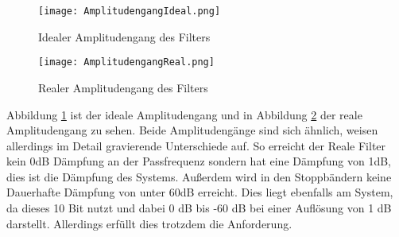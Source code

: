 \begin{figure}[H]
  \centering
    \texttt{[image: AmplitudengangIdeal.png]}
  \caption{Idealer Amplitudengang des Filters}
  \label{fig:AmpBandIdeal}
\end{figure}
\begin{figure}[H]
  \centering
    \texttt{[image: AmplitudengangReal.png]}
  \caption{Realer Amplitudengang des Filters}
  \label{fig:AmpBandReal}
\end{figure}

Abbildung \ref{fig:AmpBandIdeal} ist der ideale Amplitudengang und in Abbildung \ref{fig:AmpBandReal} der reale Amplitudengang zu sehen. 
Beide Amplitudengänge sind sich ähnlich, weisen allerdings im Detail gravierende Unterschiede auf.
So erreicht der Reale Filter kein 0dB Dämpfung an der Passfrequenz sondern hat eine Dämpfung von 1dB, dies ist die Dämpfung des Systems. Außerdem wird in den Stoppbändern keine Dauerhafte Dämpfung von unter 60dB erreicht. Dies liegt ebenfalls am System, da dieses 10 Bit nutzt und dabei
0 dB bis -60 dB bei einer Auflösung von 1 dB darstellt. Allerdings erfüllt dies trotzdem die Anforderung.
